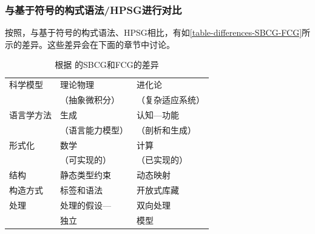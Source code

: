 \subsubsection{与基于符号的构式语法/HPSG进行对比}

按照\indexhpsgstart\indexsbcgstart \citet{vanTrijp2013a}，与基于符号的构式语法、HPSG相比，有如\vref{table-differences-SBCG-FCG}所示的差异。这些差异会在下面的章节中讨论。
%
\begin{table}
\caption{\label{table-differences-SBCG-FCG}根据 \citet[]{vanTrijp2013a}的SBCG和FCG的差异}
\begin{tabular}{@{}lll@{}}\hline\hline
科学模型    & 理论物理           & 进化论\\
                    & （抽象微积分）           &  （复杂适应系统）\\
语言学方法 & 生成                    & 认知—功能\\
                    & （语言能力模型）          & （剖析和生成）\\
形式化       & 数学                 & 计算\\ 
                    & （可实现的） & （已实现的）\\
结构       & 静态类型约束       & 动态映射\\
构造方式       & 标签和语法         & 开放式库藏\\
处理          & 处理的假设—     & 双向处理\\
                    & 独立                  & 模型\\\hline\hline
\end{tabular}
\end{table}%
